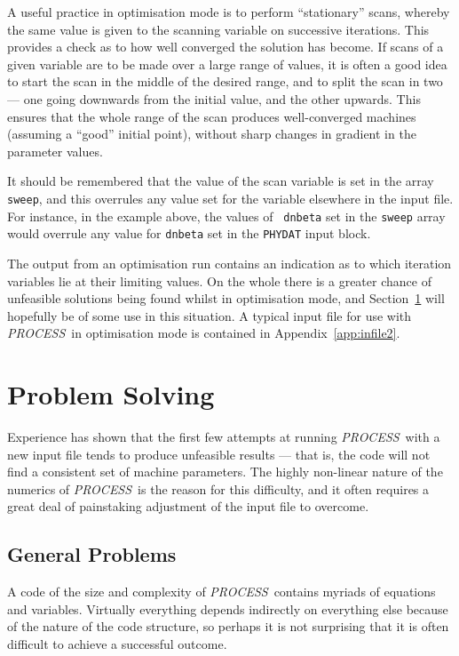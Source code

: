 \documentclass[11pt,a4paper]{report}
\newcommand{\PS}{\mbox{\it PROCESS\/ }}
\begin{document}
A useful practice in optimisation mode is to perform ``stationary'' scans,
whereby the same value is given to the scanning variable on successive
iterations. This provides a check as to how well converged the solution has
become. If scans of a given variable are to be made over a large range of
values, it is often a good idea to start the scan in the middle of the desired
range, and to split the scan in two --- one going downwards from the initial
value, and the other upwards.  This ensures that the whole range of the scan
produces well-converged machines (assuming a ``good'' initial point), without
sharp changes in gradient in the parameter values.

It should be remembered that the value of the scan variable is set in the
array {\tt sweep}, and this overrules any value set for the variable elsewhere
in the input file. For instance, in the example above, the values of {\tt
dnbeta} set in the {\tt sweep} array would overrule any value for {\tt dnbeta}
set in the {\tt PHYDAT} input block.

The output from an optimisation run contains an indication as to which
iteration variables lie at their limiting values. On the whole there is a
greater chance of unfeasible solutions being found whilst in optimisation
mode, and Section~\ref{sec:problems} will hopefully be of some use in this
situation. A typical input file for use with \PS in optimisation mode is
contained in Appendix~\ref{app:infile2}.

\section{Problem Solving}
\label{sec:problems}

Experience has shown that the first few attempts at running \PS with a new
input file tends to produce unfeasible results --- that is, the code will not
find a consistent set of machine parameters. The highly non-linear nature of
the numerics of \PS is the reason for this difficulty, and it often requires a
great deal of painstaking adjustment of the input file to overcome.

\subsection{General Problems}

A code of the size and complexity of \PS contains myriads of equations and
variables. Virtually everything depends indirectly on everything else because
of the nature of the code structure, so perhaps it is not surprising that it
is often difficult to achieve a successful outcome.
\end{document}
